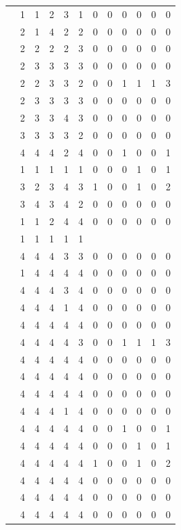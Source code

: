 \documentclass[]{book}
\theoremstyle{definition}
\theoremstyle{definition}
\theoremstyle{definition}
\theoremstyle{remark}
\begin{document}
\begin{table}
{\begin{tabular}[t]{rrrrrrrrrrrr}
 & 1 & 1 & 2 & 3 & 1 & 0 & 0 & 0 & 0 & 0 & 0\\
 & 2 & 1 & 4 & 2 & 2 & 0 & 0 & 0 & 0 & 0 & 0\\
 & 2 & 2 & 2 & 2 & 3 & 0 & 0 & 0 & 0 & 0 & 0\\
 & 2 & 3 & 3 & 3 & 3 & 0 & 0 & 0 & 0 & 0 & 0\\
 & 2 & 2 & 3 & 3 & 2 & 0 & 0 & 1 & 1 & 1 & 3\\
 & 2 & 3 & 3 & 3 & 3 & 0 & 0 & 0 & 0 & 0 & 0\\
 & 2 & 3 & 3 & 4 & 3 & 0 & 0 & 0 & 0 & 0 & 0\\
 & 3 & 3 & 3 & 3 & 2 & 0 & 0 & 0 & 0 & 0 & 0\\
 & 4 & 4 & 4 & 2 & 4 & 0 & 0 & 1 & 0 & 0 & 1\\
 & 1 & 1 & 1 & 1 & 1 & 0 & 0 & 0 & 1 & 0 & 1\\
 & 3 & 2 & 3 & 4 & 3 & 1 & 0 & 0 & 1 & 0 & 2\\
 & 3 & 4 & 3 & 4 & 2 & 0 & 0 & 0 & 0 & 0 & 0\\
 & 1 & 1 & 2 & 4 & 4 & 0 & 0 & 0 & 0 & 0 & 0\\
 & 1 & 1 & 1 & 1 & 1 &  &  &  &  &  & \\
 & 4 & 4 & 4 & 3 & 3 & 0 & 0 & 0 & 0 & 0 & 0\\
 & 1 & 4 & 4 & 4 & 4 & 0 & 0 & 0 & 0 & 0 & 0\\
 & 4 & 4 & 4 & 3 & 4 & 0 & 0 & 0 & 0 & 0 & 0\\
 & 4 & 4 & 4 & 1 & 4 & 0 & 0 & 0 & 0 & 0 & 0\\
 & 4 & 4 & 4 & 4 & 4 & 0 & 0 & 0 & 0 & 0 & 0\\
 & 4 & 4 & 4 & 4 & 3 & 0 & 0 & 1 & 1 & 1 & 3\\
 & 4 & 4 & 4 & 4 & 4 & 0 & 0 & 0 & 0 & 0 & 0\\
 & 4 & 4 & 4 & 4 & 4 & 0 & 0 & 0 & 0 & 0 & 0\\
 & 4 & 4 & 4 & 4 & 4 & 0 & 0 & 0 & 0 & 0 & 0\\
 & 4 & 4 & 4 & 1 & 4 & 0 & 0 & 0 & 0 & 0 & 0\\
 & 4 & 4 & 4 & 4 & 4 & 0 & 0 & 1 & 0 & 0 & 1\\
 & 4 & 4 & 4 & 4 & 4 & 0 & 0 & 0 & 1 & 0 & 1\\
 & 4 & 4 & 4 & 4 & 4 & 1 & 0 & 0 & 1 & 0 & 2\\
 & 4 & 4 & 4 & 4 & 4 & 0 & 0 & 0 & 0 & 0 & 0\\
 & 4 & 4 & 4 & 4 & 4 & 0 & 0 & 0 & 0 & 0 & 0\\
 & 4 & 4 & 4 & 4 & 4 & 0 & 0 & 0 & 0 & 0 & 0\\

\end{tabular}}
\end{table}
\end{document}
